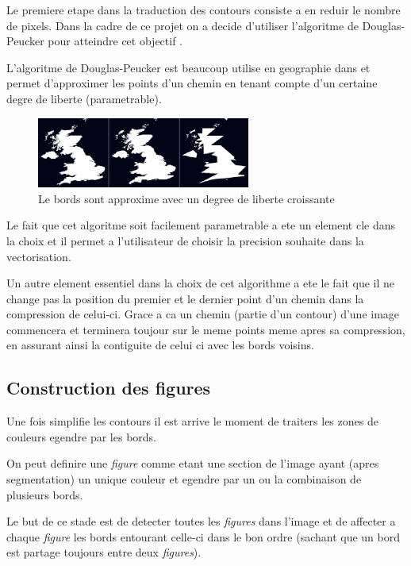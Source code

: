 \documentclass[twoside,openright,a4paper,11pt,french]{article}
\begin{document}
Le premiere etape dans la traduction des contours consiste a en reduir
le nombre de pixels. Dans la cadre de ce projet on a decide d'utiliser
l'algoritme de Douglas-Peucker pour atteindre cet objectif
\cite{url-dougpeuck}.

L'algoritme de Douglas-Peucker est beaucoup utilise en geographie dans
et permet d'approximer les points d'un chemin en tenant compte d'un
certaine degre de liberte (parametrable).

\begin{figure}[h]
\centering
\includegraphics[width=7cm]{./pics/dp1.eps}
\caption{Le bords sont approxime avec un degree de liberte croissante}
\label{fig:routcidr}
\end{figure}

Le fait que cet algoritme soit facilement parametrable a ete un
element cle dans la choix et il permet a l'utilisateur de choisir la
precision souhaite dans la vectorisation.

Un autre element essentiel dans la choix de cet algorithme a ete le
fait que il ne change pas la position du premier et le dernier point
d'un chemin dans la compression de celui-ci. Grace a ca un chemin
(partie d'un contour) d'une image commencera et terminera toujour sur
le meme points meme apres sa compression, en assurant ainsi la
contiguite de celui ci avec les bords voisins.



\subsection{Construction des figures}
Une fois simplifie les contours il est arrive le moment de traiters
les zones de couleurs egendre par les bords.

On peut definire une {\it figure} comme etant une section de l'image
ayant (apres segmentation) un unique couleur et egendre par un ou
la combinaison de plusieurs bords.

Le but de ce stade est de detecter toutes les {\it figures} dans l'image et
de affecter a chaque {\it figure} les bords entourant celle-ci dans le
bon ordre (sachant que un bord est partage toujours entre deux
{\it figures}).
\end{document}
